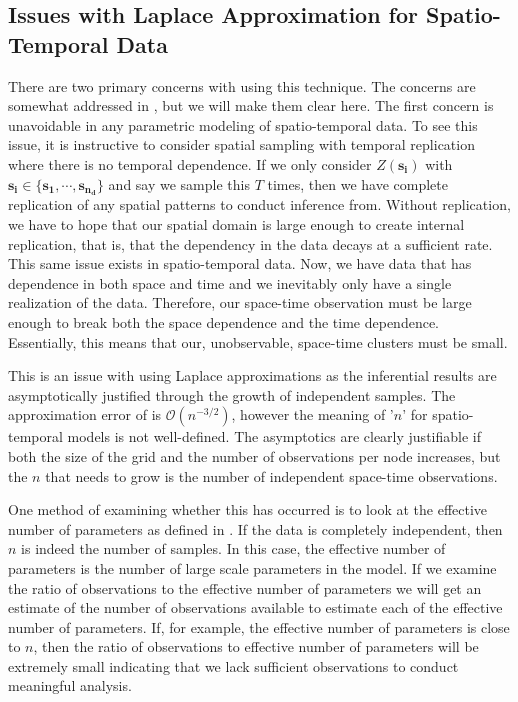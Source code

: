 \documentclass[11pt]{isuthesis}
\begin{document}
	\subsection{Issues with Laplace Approximation for Spatio-Temporal Data}
	There are two primary concerns with using this technique.  The concerns are somewhat addressed in \cite{rue2009approximate}, but we will make them clear here.  The first concern is unavoidable in any parametric modeling of spatio-temporal data.  To see this issue, it is instructive to consider spatial sampling with temporal replication where there is no temporal dependence.  If we only consider $Z(\boldsymbol{s_i})$ with $\boldsymbol{s_i}\in \{\boldsymbol{s_1},\cdots,\boldsymbol{s_{n_d}}\}$ and say we sample this $T$ times, then we have complete replication of any spatial patterns to conduct inference from.  Without replication, we have to hope that our spatial domain is large enough to create internal replication, that is, that the dependency in the data decays at a sufficient rate.  This same issue exists in spatio-temporal data.  Now, we have data that has dependence in both space and time and we inevitably only have a single realization of the data.  Therefore, our space-time observation must be large enough to break both the space dependence and the time dependence.  Essentially, this means that our, unobservable, space-time clusters must be small.
	
	This is an issue with using Laplace approximations as the inferential results are asymptotically justified through the growth of independent samples.  The approximation error of \cite{tierney1986accurate} is $\mathcal{O}(n^{-3/2})$, however the meaning of '$n$' for spatio-temporal models is not well-defined.   The asymptotics are clearly justifiable if both the size of the grid and the number of observations per node increases, but the $n$ that needs to grow is the number of independent space-time observations.
	
	One method of examining whether this has occurred is to look at the effective number of parameters as defined in \cite{spiegelhalter1998bayesian}.  If the data is completely independent, then $n$ is indeed the number of samples.  In this case, the effective number of parameters is the number of large scale parameters in the model.  If we examine the ratio of observations to the effective number of parameters we will get an estimate of the number of observations available to estimate each of the effective number of parameters.  If, for example, the effective number of parameters is close to $n$, then the ratio of observations to effective number of parameters will be extremely small indicating that we lack sufficient observations to conduct meaningful analysis. 
	
\end{document}
